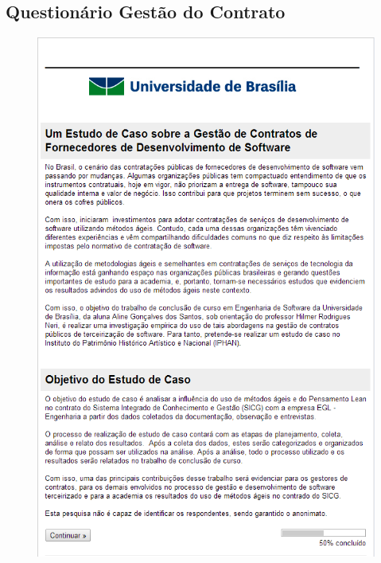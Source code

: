 \begin{apendicesenv}

\partapendices

\chapter{Questionário Gestão do Contrato}

\begin{figure}[H]
		\centering
			\includegraphics[scale=0.9]{figuras/quest1.png}

		\label{quest1}
\end{figure}


\end{apendicesenv}
